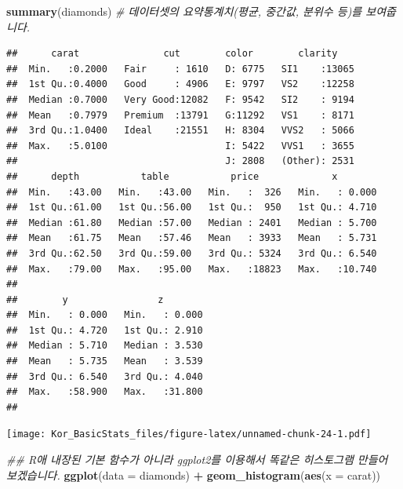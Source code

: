 \documentclass[]{book}
\newenvironment{Shaded}{\begin{snugshade}}{\end{snugshade}}
\newcommand{\CommentTok}[1]{\textcolor[rgb]{0.56,0.35,0.01}{\textit{#1}}}
\newcommand{\DataTypeTok}[1]{\textcolor[rgb]{0.13,0.29,0.53}{#1}}
\newcommand{\KeywordTok}[1]{\textcolor[rgb]{0.13,0.29,0.53}{\textbf{#1}}}
\newcommand{\NormalTok}[1]{#1}
\newcommand{\OperatorTok}[1]{\textcolor[rgb]{0.81,0.36,0.00}{\textbf{#1}}}
\newcommand{\StringTok}[1]{\textcolor[rgb]{0.31,0.60,0.02}{#1}}
\begin{document}
\begin{Shaded}
\begin{Highlighting}[]
\KeywordTok{summary}\NormalTok{(diamonds) }\CommentTok{# 데이터셋의 요약통계치(평균, 중간값, 분위수 등)를 보여줍니다.}
\end{Highlighting}
\end{Shaded}

\begin{verbatim}
##      carat               cut        color        clarity     
##  Min.   :0.2000   Fair     : 1610   D: 6775   SI1    :13065  
##  1st Qu.:0.4000   Good     : 4906   E: 9797   VS2    :12258  
##  Median :0.7000   Very Good:12082   F: 9542   SI2    : 9194  
##  Mean   :0.7979   Premium  :13791   G:11292   VS1    : 8171  
##  3rd Qu.:1.0400   Ideal    :21551   H: 8304   VVS2   : 5066  
##  Max.   :5.0100                     I: 5422   VVS1   : 3655  
##                                     J: 2808   (Other): 2531  
##      depth           table           price             x         
##  Min.   :43.00   Min.   :43.00   Min.   :  326   Min.   : 0.000  
##  1st Qu.:61.00   1st Qu.:56.00   1st Qu.:  950   1st Qu.: 4.710  
##  Median :61.80   Median :57.00   Median : 2401   Median : 5.700  
##  Mean   :61.75   Mean   :57.46   Mean   : 3933   Mean   : 5.731  
##  3rd Qu.:62.50   3rd Qu.:59.00   3rd Qu.: 5324   3rd Qu.: 6.540  
##  Max.   :79.00   Max.   :95.00   Max.   :18823   Max.   :10.740  
##                                                                  
##        y                z         
##  Min.   : 0.000   Min.   : 0.000  
##  1st Qu.: 4.720   1st Qu.: 2.910  
##  Median : 5.710   Median : 3.530  
##  Mean   : 5.735   Mean   : 3.539  
##  3rd Qu.: 6.540   3rd Qu.: 4.040  
##  Max.   :58.900   Max.   :31.800  
## 
\end{verbatim}

\begin{Shaded}
\end{Shaded}

\texttt{[image: Kor\_BasicStats\_files/figure-latex/unnamed-chunk-24-1.pdf]}

\begin{Shaded}
\begin{Highlighting}[]
\CommentTok{## R애 내장된 기본 함수가 아니라 ggplot2를 이용해서 똑같은 히스토그램 만들어 보겠습니다.}
\KeywordTok{ggplot}\NormalTok{(}\DataTypeTok{data =}\NormalTok{ diamonds) }\OperatorTok{+}\StringTok{ }\KeywordTok{geom_histogram}\NormalTok{(}\KeywordTok{aes}\NormalTok{(}\DataTypeTok{x =}\NormalTok{ carat))}
\end{Highlighting}
\end{Shaded}
\end{document}

